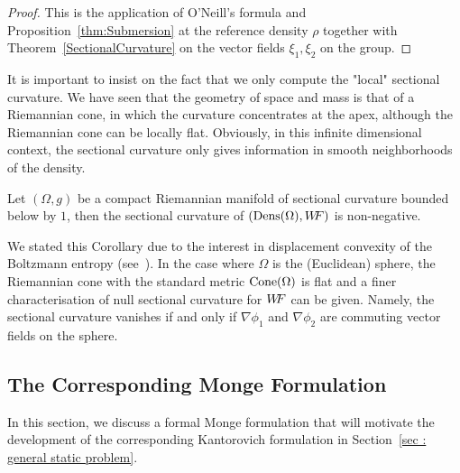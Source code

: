 \begin{proof}
This is the application of O'Neill's formula \cite[Corollary
6.2]{Lang1999} and Proposition~\ref{thm:Submersion} at the reference density
$\rho$ together with Theorem~\ref{SectionalCurvature} on the vector fields $\xi_1,\xi_2$ on the group.
\end{proof}

\begin{remark}
 It is important to insist on the fact that we only compute the "local"
sectional curvature. We have seen that the geometry of space and mass is
that of a Riemannian cone, in which the curvature concentrates
at the apex, although the Riemannian cone can be locally flat. Obviously, in
this infinite dimensional context, the sectional curvature only gives
information in smooth neighborhoods of the density. %
 \end{remark}




\begin{corollary}\label{th:CorollaryCurvature}
Let $(\Omega,g)$ be a compact Riemannian manifold of sectional curvature bounded below by $1$,
then the sectional curvature of $(\operatorname{Dens}(\Omega),W\! \! F)$ is non-negative. %
\end{corollary}

We stated this Corollary due to the interest in displacement convexity of the Boltzmann entropy (see~\cite[Corollary 17.19]{villani2009oldnew}). In the case where $\Omega$ is the (Euclidean) sphere, the Riemannian cone with the standard metric $\operatorname{Cone}(\Omega)$ is flat and a finer characterisation of null sectional curvature for $W\! \! F$ can be given. Namely, the sectional curvature vanishes if and only if $\nabla \phi_1$ and $\nabla \phi_2$ are commuting vector fields on the sphere.

\subsection{The Corresponding Monge Formulation} \label{Monge}

In this section, we discuss a formal Monge formulation that will motivate the development of the corresponding Kantorovich formulation in Section~\ref{sec : general static problem}.
 
